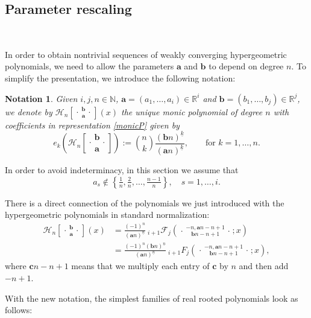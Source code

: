 \documentclass[reqno,11pt]{amsart}
\newtheorem{notation}[theorem]{Notation}
\theoremstyle{remark}
\newcommand{\R}{\mathbb{R}}
\newcommand{\nn}{\mathbb{N}}
\newcommand{\falling}[2]{\left(#1\right)^{\underline{#2}}}
\newcommand*\pFq[5]{%
 {\ }_{#1}{\mathcal F}_{#2}{\left(\genfrac..{0pt}{}{#3}{#4};#5\right)}%
}
\newcommand*\HGF[5]{%
 {\ }_{#1} F_{#2}{\left(\genfrac..{0pt}{}{#3}{#4};#5\right)}%
}
\newcommand*\HGP[3]{%
 \mathcal{H}_{#1}{\left[\genfrac..{0pt}{1}{#2}{#3}\right]}%
}
\begin{document}
\subsection{Parameter rescaling}
\label{ssec:interpretation} \

In order to obtain nontrivial sequences of weakly converging hypergeometric polynomials, we need to allow the parameters $\bm a$ and $\bm b$ to depend on degree $n$. To simplify the presentation, we introduce the following notation:
\begin{notation}
Given $i,j,n\in \nn$, $\bm a =(a_1, \dots, a_i)\in \R^i$ and $\bm b =(b_1, \dots, b_j)\in \R^j$, we denote by $\HGP{n}{\bm b}{\bm a }(x)$ the unique monic polynomial of degree $n$ with coefficients in representation \eqref{monicP} given by
$$
e_k\left(\HGP{n}{\bm b}{\bm a}\right):=\binom{n}{k} \frac{\falling{\bm b n}{k}}{\falling{\bm a n}{k}}, \qquad \text{for }k=1,\dots,n.
$$
\end{notation}
In order to avoid indeterminacy, in this section we assume that
$$
a_s\not \in \left\{\tfrac{1}{n},\tfrac{2}{n}, \dots, \tfrac{n-1}{n}\right \}, \quad s=1, \dots, i.
$$

There is a direct connection of the polynomials we just introduced with the  hypergeometric polynomials in standard normalization:
\begin{equation}
\begin{split}
\HGP{n}{\bm b}{\bm a }(x) & =\frac{(-1)^n}{\falling{\bm a n}{n}} \pFq{i+1}{j}{-n, \bm a n -n+1}{\bm b n -n+1}{x} \\
& =\frac{(-1)^n\falling{\bm b n}{n}}{\falling{\bm a n}{n}} \HGF{i+1}{j}{-n, \bm a n -n+1}{\bm b n -n+1}{x} ,
\end{split}
\end{equation}
where $\bm c n -n+1$ means that we multiply each entry of $\bm c$ by $n$ and then  add $-n+1$. 

With the new notation, the simplest families of real rooted polynomials look as follows:
\end{document}
